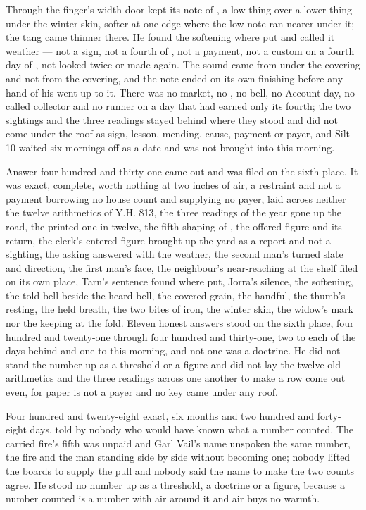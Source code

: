 Through the finger's-width door  kept its note of , a low thing over a lower thing under the winter skin, softer at one edge where the low note ran nearer under it; the tang came thinner there. He found the softening where put and called it weather --- not a sign, not a fourth of , not a payment, not a custom on a fourth day of , not looked twice or made again. The sound came from under the covering and not from the covering, and the note ended on its own finishing before any hand of his went up to it. There was no market, no , no bell, no Account-day, no called collector and no runner on a day that had earned only its fourth; the two sightings and the three readings stayed behind where they stood and did not come under the roof as sign, lesson, mending, cause, payment or payer, and Silt 10 waited six mornings off as a date and was not brought into this morning.

Answer four hundred and thirty-one came out and was filed on the sixth place. It was exact, complete, worth nothing at two inches of air, a restraint and not a payment borrowing no house count and supplying no payer, laid across neither the twelve arithmetics of Y.H. 813, the three readings of the year gone up the road, the printed one in twelve, the fifth shaping of , the offered figure and its return, the clerk's entered figure brought up the yard as a report and not a sighting, the asking answered with the weather, the second man's turned slate and direction, the first man's face, the neighbour's near-reaching at the shelf filed on its own place, Tarn's sentence found where put, Jorra's silence, the softening, the told bell beside the heard bell, the covered grain, the handful, the thumb's resting, the held breath, the two bites of iron, the winter skin, the widow's mark nor the keeping at the fold. Eleven honest answers stood on the sixth place, four hundred and twenty-one through four hundred and thirty-one, two to each of the days behind and one to this morning, and not one was a doctrine. He did not stand the number up as a threshold or a figure and did not lay the twelve old arithmetics and the three readings across one another to make a row come out even, for paper is not a payer and no key came under any roof.

Four hundred and twenty-eight exact, six months and two hundred and forty-eight days, told by nobody who would have known what a number counted. The carried fire's fifth was unpaid and Garl Vail's name unspoken the same number, the fire and the man standing side by side without becoming one; nobody lifted the boards to supply the pull and nobody said the name to make the two counts agree. He stood no number up as a threshold, a doctrine or a figure, because a number counted is a number with air around it and air buys no warmth.

